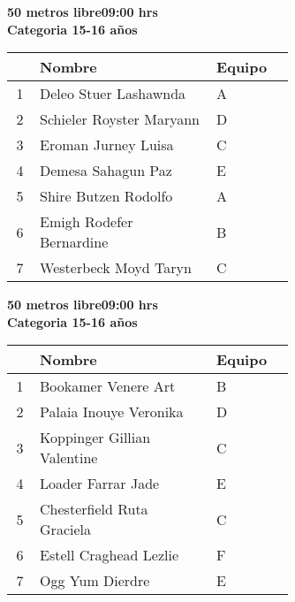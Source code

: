 \begin{minipage}{0.95\linewidth}\vspace{0.5cm} 
\begin{flushleft}
\textbf{
\hspace{-0.15cm}50 metros libre\hspace{1.5cm}09:00 hrs \\Categoria 15-16 años}\vspace{-0.2cm} 
\end{flushleft}
\begin{tabular}{cp{0.63\linewidth}l}
\hline
& \textbf{Nombre} & \textbf{Equipo} \\ \hline
1 & Deleo Stuer Lashawnda & A \\ 
2 & Schieler Royster Maryann & D \\ 
3 & Eroman Jurney Luisa & C \\ 
4 & Demesa Sahagun Paz & E \\ 
5 & Shire Butzen Rodolfo & A \\ 
6 & Emigh Rodefer Bernardine & B \\ 
7 & Westerbeck Moyd Taryn & C \\ 
\end{tabular}
\end{minipage}
\begin{minipage}{0.95\linewidth}\vspace{0.5cm} 
\begin{flushleft}
\textbf{
\hspace{-0.15cm}50 metros libre\hspace{1.5cm}09:00 hrs \\Categoria 15-16 años}\vspace{-0.2cm} 
\end{flushleft}
\begin{tabular}{cp{0.63\linewidth}l}
\hline
& \textbf{Nombre} & \textbf{Equipo} \\ \hline
1 & Bookamer Venere Art & B \\ 
2 & Palaia Inouye Veronika & D \\ 
3 & Koppinger Gillian Valentine & C \\ 
4 & Loader Farrar Jade & E \\ 
5 & Chesterfield Ruta Graciela & C \\ 
6 & Estell Craghead Lezlie & F \\ 
7 & Ogg Yum Dierdre & E \\ 
\end{tabular}
\end{minipage}
